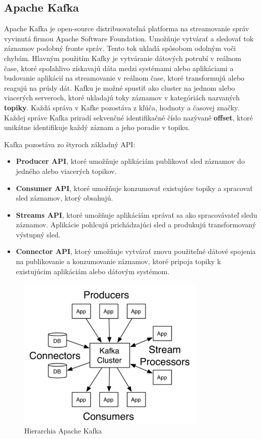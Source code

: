 \subsection{Apache Kafka}
Apache Kafka je open-source distribuovateľná platforma na streamovanie správ vyvinutá firmou Apache Software Foundation. Umožňuje vytvárať a sledovať tok záznamov podobný fronte správ. Tento tok ukladá spôsobom odolným voči chybám. Hlavným použitím Kafky je vytváranie dátových potrubí v reálnom čase, ktoré spoľahlivo získavajú dáta medzi systémami alebo aplikáciami a budovanie aplikácií na streamovanie v reálnom čase, ktoré transformujú alebo reagujú na prúdy dát. Kafku je možné spustiť ako cluster na jednom alebo viacerých serveroch, ktoré ukladajú toky záznamov v kategóriách nazvaných \textbf{topiky}. Každá správa v Kafke pozostáva z kľúča, hodnoty a časovej značky. Každej správe Kafka priradí sekvenčné identifikačné číslo nazývané \textbf{offset}, ktoré unikátne identifikuje každý záznam a jeho poradie v topiku.

Kafka pozostáva zo štyroch základný API:\cite{Kafka}
\begin{itemize}
\item \textbf{Producer API}, ktoré umožňuje aplikáciám publikovať sled záznamov do jedného alebo viacerých topikov.
\item \textbf{Consumer API}, ktoré umožňuje konzumovať existujúce topiky a spracovať sled záznamov, ktorý obsahujú.
\item \textbf{Streams API}, ktoré umožňuje aplikáciám správať sa ako spracovávateľ sledu záznamov. Aplikácie pohlcujú prichádzajúci sled a produkujú transformovaný výstupný sled.
\item \textbf{Connector API}, ktorý umožňuje vytvárať znovu použiteľné dátové spojenia na publikovanie a konzumovanie záznamov, ktoré pripoja topiky k existujúcim aplikáciám alebo dátovým systémom.
\end{itemize}

\begin{figure}[H]
\begin{center}
\includegraphics[width=9cm]{figures/kafka_hierarchy.PNG}
\caption{Hierarchia Apache Kafka}
\label{fig:kafka_hierarchy}
\end{center}
\end{figure}

